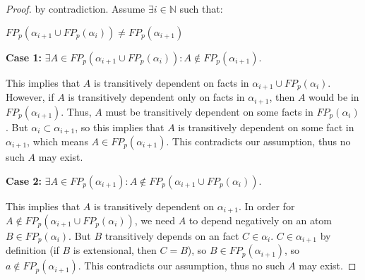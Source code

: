 
\begin{proof}



by contradiction. Assume $\exists i \in \mathbb{N}$ such that:

$FP_p(\alpha_{i+1} \cup FP_p(\alpha_i)) \neq FP_p(\alpha_{i+1})$

{\bf Case 1:} $\exists A \in FP_p(\alpha_{i+1} \cup FP_p(\alpha_i)) : A \not\in FP_p(\alpha_{i+1}).$

This implies that $A$ is transitively dependent on facts in $\alpha_{i+1} \cup
FP_p(\alpha_i)$.  However, if $A$ is transitively dependent only on facts in
$\alpha_{i+1}$, then $A$ would be in $FP_p(\alpha_{i+1})$.  Thus, $A$ must be
transitively dependent on some facts in $FP_p(\alpha_{i})$.  But $\alpha_{i}
\subset \alpha_{i+1}$, so this implies that $A$ is transitively dependent on
some fact in $\alpha_{i+1}$, which means $A \in FP_p(\alpha_{i+1})$.  This
contradicts our assumption, thus no such $A$ may exist.

{\bf Case 2:} $\exists A \in FP_p(\alpha_{i+1}) : A \not\in FP_p(\alpha_{i+1} \cup FP_p(\alpha_i)).$

This implies that $A$ is transitively dependent on $\alpha_{i+1}$.  In order
for $A \not\in FP_p(\alpha_{i+1} \cup FP_p(\alpha_i))$, we need $A$ to depend
negatively on an atom $B \in FP_p(\alpha_i)$.  But $B$ transitively depends on
an fact $C \in \alpha_i$.  $C \in \alpha_{i+1}$ by definition (if $B$ is
extensional, then $C=B$), so $B \in FP_p(\alpha_{i+1})$, so $a \not\in
FP_p(\alpha_{i+1})$.  This contradicts our assumption, thus no such $A$ may
exist.




\end{proof}

